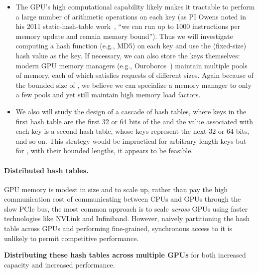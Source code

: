 \begin{itemize}%
  \item The GPU's high computational capability likely makes it tractable to perform a large number of arithmetic operations on each key (as PI Owens noted in his 2011 static-hash-table work~\cite{Alcantara:2011:BAE}, ``we can run up to 1000 instructions per memory update and remain memory bound''). Thus we will investigate computing a hash function (e.g., MD5) on each key and use the (fixed-size) hash value as the key. If necessary, we can also store the keys themselves: modern GPU memory managers (e.g., Ouroboros~\cite{Winter:2020:OVQ}) maintain multiple pools of memory, each of which satisfies requests of different sizes. Again because of the bounded size of \kmers, we believe we can specialize a memory manager to only a few pools and yet still maintain high memory load factors.
  \item We also will study the design of a cascade of hash tables, where keys in the first hash table are the first 32 or 64 bits of the \kmer and the value associated with each key is a second hash table, whose keys represent the next 32 or 64 bits, and so on. This strategy would be impractical for arbitrary-length keys but for \kmers, with their bounded lengths, it appears to be feasible.
\end{itemize}


\paragraph{Distributed hash tables.}
GPU memory is modest in size and to scale up, rather than pay the high communication cost of communicating between CPUs and GPUs through the slow PCIe bus, the most common approach is to scale \emph{across} GPUs using faster technologies like NVLink and Infiniband. However, naively partitioning the hash table across GPUs and performing fine-grained, synchronous access to it is unlikely to permit competitive performance.

\begin{rproblem}
  \textbf{Distributing these hash tables across multiple GPUs} for both increased capacity and increased performance.
  \label{rprob:dist-hashtable}
\end{rproblem}

\noindent
